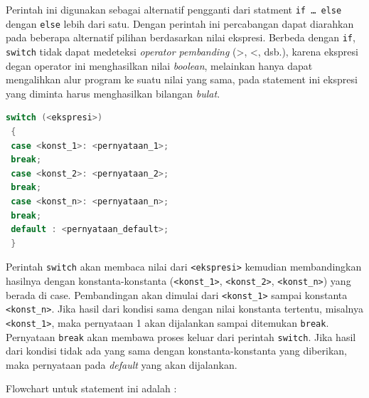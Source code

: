 Perintah ini digunakan sebagai alternatif pengganti dari statment
\texttt{if\ \ldots{}\ else} dengan \texttt{else} lebih dari satu. Dengan
perintah ini percabangan dapat diarahkan pada beberapa alternatif
pilihan berdasarkan nilai ekspresi. Berbeda dengan \texttt{if},
\texttt{switch} tidak dapat medeteksi \emph{operator pembanding}
(\textgreater{}, \textless{}, dsb.), karena ekspresi degan operator ini
menghasilkan nilai \emph{boolean}, melainkan hanya dapat mengalihkan
alur program ke suatu nilai yang sama, pada statement ini ekspresi yang
diminta harus menghasilkan bilangan \emph{bulat}.

\begin{lstlisting}[language=c++, numbers=none]
 switch (<ekspresi>)
 {
 case <konst_1>: <pernyataan_1>;
 break;
 case <konst_2>: <pernyataan_2>;
 break;
 case <konst_n>: <pernyataan_n>;
 break;
 default : <pernyataan_default>;
 }
\end{lstlisting}

Perintah \texttt{switch} akan membaca nilai dari
\texttt{\textless{}ekspresi\textgreater{}} kemudian membandingkan
hasilnya dengan konstanta-konstanta
(\texttt{\textless{}konst\_1\textgreater{}},
\texttt{\textless{}konst\_2\textgreater{}},
\texttt{\textless{}konst\_n\textgreater{}}) yang berada di case.
Pembandingan akan dimulai dari
\texttt{\textless{}konst\_1\textgreater{}} sampai konstanta
\texttt{\textless{}konst\_n\textgreater{}}. Jika hasil dari kondisi sama
dengan nilai konstanta tertentu, misalnya
\texttt{\textless{}konst\_1\textgreater{}}, maka pernyataan 1 akan
dijalankan sampai ditemukan \texttt{break}. Pernyataan \texttt{break}
akan membawa proses keluar dari perintah \texttt{switch}. Jika hasil
dari kondisi tidak ada yang sama dengan konstanta-konstanta yang
diberikan, maka pernyataan pada \emph{default} yang akan dijalankan.

Flowchart untuk statement ini adalah :

